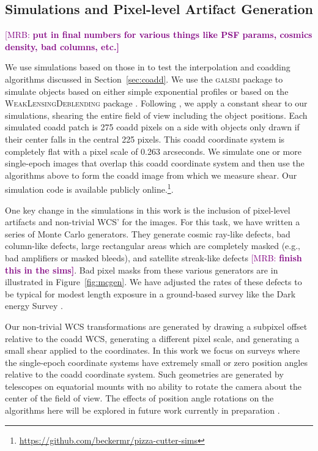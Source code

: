 \documentclass[twocolappendix, appendixfloats, numberedappendix, twocolumn, apj]{openjournal}
\newcommand{\mrb}[1]{\textcolor{purple}{[MRB: \bf #1]}\xspace}
\newcommand{\galsim}{\textsc{galsim}\xspace}
\newcommand{\descwl}{\textsc{WeakLensingDeblending}\xspace}
\begin{document}
\subsection{Simulations and Pixel-level Artifact Generation}

\mrb{put in final numbers for various things like PSF params, cosmics density, bad columns, etc.}

We use simulations based on those in \citet{mdet} to test the interpolation and coadding algorithms
discussed in Section~\ref{sec:coadd}. We use the \galsim package \citep{GALSIM2015} to simulate
objects based on either simple exponential profiles or based on the \descwl package
\citep{WeakLensingDeblendingPaper,WeakLensingDeblendingSoftware}. Following \citet{mdet}, we apply a constant shear
to our simulations, shearing the entire field of view including the object positions. Each simulated coadd patch is
275 coadd pixels on a side with objects only drawn if their center falls in the central 225 pixels. This coadd coordinate
system is completely flat with a pixel scale of 0.263 arcseconds. We simulate one or more single-epoch images that overlap this
coadd coordinate system and then use the algorithms above to form the coadd image from which we measure shear.
Our simulation code is available publicly online.\footnote{\url{https://github.com/beckermr/pizza-cutter-sims}}.

One key change in the simulations in this work is the inclusion of pixel-level artifacts and non-trivial
WCS' for the images. For this task, we have written a series of Monte Carlo generators. They generate
cosmic ray-like defects, bad column-like defects, large rectangular areas which are completely masked (e.g.,
bad amplifiers or masked bleeds), and satellite streak-like defects \mrb{finish this in the sims}. Bad pixel
masks from these various generators are in illustrated in Figure~\ref{fig:mcgen}. We have adjusted the rates
of these defects to be typical for modest length exposure in a ground-based survey like the Dark energy Survey
\citep{des}.

Our non-trivial WCS transformations are generated by drawing a subpixel offset relative to the coadd WCS,
generating a different pixel scale, and generating a small shear applied to the coordinates. In this work we focus on
surveys where the single-epoch coordinate systems have extremely small or zero position angles relative to the
coadd coordinate system. Such geometries are generated by telescopes on equatorial mounts with no ability to rotate the
camera about the center of the field of view. The effects of position angle rotations on the algorithms
here will be explored in future work currently in preparation \citep{sheldoninprep}.
\end{document}
